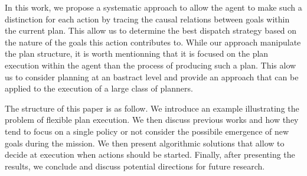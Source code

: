 In this work, we propose a systematic approach to allow the agent to
make such a distinction for each action by tracing the causal relations
between goals within the current plan. This allow us to determine the
best dispatch strategy based on the nature of the goals this action
contributes to. While our approach manipulate the plan structure, it
is worth mentionning that it is focused on the plan execution within 
the agent than the process of producing such a plan. This alow us to
consider planning at an bastract level and provide an approach that
can be  applied to the execution of a large class of planners.

The structure of this paper is as follow. We introduce an example 
illustrating the problem of flexible plan execution. We then discuss
previous works and how they tend to focus on a single policy or not
consider the possibile emergence of new goals during the mission. We
then present algorithmic solutions that allow to decide at execution
when actions should be started. Finally, after presenting the results,
we conclude and discuss potential directions for future research.






